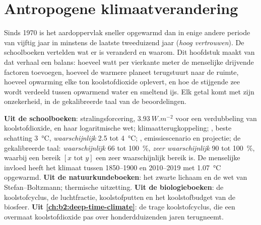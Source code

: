 \chapter{Antropogene klimaatverandering}\label{ch:b2:anthropogenic-climate-change}

Sinds 1970 is het aardoppervlak sneller opgewarmd dan in enige andere periode van vijftig jaar in minstens
de laatste tweeduizend jaar (\emph{hoog vertrouwen}). De schoolboeken vertelden wat er is veranderd en
waarom. Dit hoofdstuk maakt van dat verhaal een balans: hoeveel watt per vierkante meter de menselijke
drijvende factoren toevoegen, hoeveel de warmere planeet terugstuurt naar de ruimte, hoeveel opwarming elke ton
koolstofdioxide oplevert, en hoe de stijgende zee wordt verdeeld tussen opwarmend water en smeltend ijs. Elk getal
komt met zijn onzekerheid, in de gekalibreerde taal van de beoordelingen.

\begin{recall}
\textbf{Uit de schoolboeken}: stralingsforcering, $\qty{3.93}{W.m^{-2}}$ voor een verdubbeling van
koolstofdioxide, en haar logaritmische wet; klimaatterugkoppeling; , beste
schatting \qty{3}{\celsius}, \emph{waarschijnlijk} 2.5 tot \qty{4}{\celsius}; , emissiescenario
en projectie; de gekalibreerde taal: \emph{waarschijnlijk} 66 tot \qty{100}{\percent}, \emph{zeer
waarschijnlijk} 90 tot \qty{100}{\percent}, waarbij een bereik $[x \text{ tot } y]$ een zeer waarschijnlijk bereik is. De menselijke
invloed heeft het klimaat tussen 1850--1900 en 2010--2019 met \qty{1.07}{\celsius} opgewarmd.
\textbf{Uit de natuurkundeboeken}: het zwarte lichaam en de wet van Stefan--Boltzmann; thermische uitzetting.
\textbf{Uit de biologieboeken}: de koolstofcyclus, de luchtfractie, koolstofputten en het
koolstofbudget van de biosfeer. \textbf{Uit \cref{ch:b2:deep-time-climate}}: de trage koolstofcyclus,
die een overmaat koolstofdioxide pas over honderdduizenden jaren terugneemt.
\end{recall}

